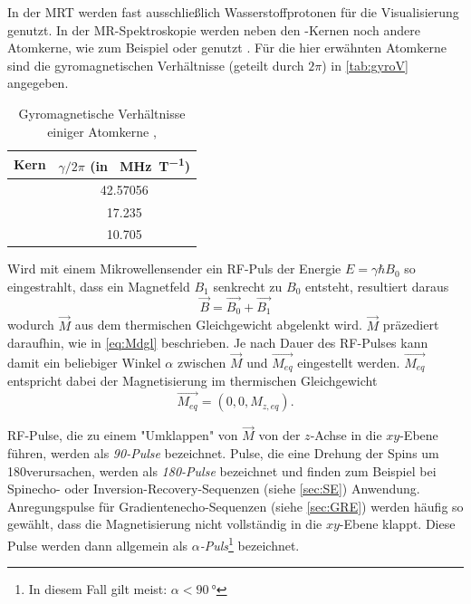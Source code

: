 In der MRT werden fast ausschließlich Wasserstoffprotonen für die Visualisierung genutzt. In der MR-Spektroskopie werden neben den -Kernen noch andere Atomkerne, wie zum Beispiel  oder  genutzt \cite{Andrade2014}. Für die hier erwähnten Atomkerne sind die gyromagnetischen Verhältnisse (geteilt durch $2\pi$) in \autoref{tab:gyroV} angegeben.

\begin{table}[H]
	\centering
	\caption[Auswahl gyromagnetischer Verhältnisse]{Gyromagnetische Verhältnisse einiger Atomkerne \cite{Seidel2015},\cite{Weast1984}}
	\label{tab:gyroV}
	\begin{tabular}{lS}
		\toprule
		\textbf{Kern} & \textbf{$\gamma/2\pi$ (in \SI{}{\mega\hertz\per\tesla})} \\
		\midrule
		 & 42.57056 \\
		 & 17.235 \\
		 & 10.705 \\
		\bottomrule
	\end{tabular}
\end{table}

Wird mit einem Mikrowellensender ein RF-Puls der Energie $E=\gamma \hbar B_0$ so eingestrahlt, dass ein Magnetfeld $B_1$ senkrecht zu $B_0$ entsteht, resultiert daraus
\begin{equation}
	\vec{B}=\vec{B_0}+\vec{B_1}
\end{equation}
wodurch $\vec{M}$ aus dem thermischen Gleichgewicht abgelenkt wird. $\vec{M}$ präzediert daraufhin, wie in \autoref{eq:Mdgl} beschrieben. Je nach Dauer des RF-Pulses kann damit ein beliebiger Winkel $\alpha$ zwischen $\vec{M}$ und $\vec{M_{eq}}$ eingestellt werden. $\vec{M_{eq}}$ entspricht dabei der Magnetisierung im thermischen Gleichgewicht
\begin{equation}
	\vec{M_{eq}} = (0,0,M_{z,eq}).
\end{equation}
 
RF-Pulse, die zu einem "Umklappen" von $\vec{M}$ von der $z$-Achse in die $xy$-Ebene führen, werden als \textit{90\degree-Pulse} bezeichnet. Pulse, die eine Drehung der Spins um 180\degree verursachen, werden als \textit{180\degree-Pulse} bezeichnet und finden zum Beispiel bei Spinecho- oder Inversion-Recovery-Sequenzen (siehe \autoref{sec:SE}) Anwendung. Anregungspulse für Gradienten\-echo-Sequenzen (siehe \autoref{sec:GRE}) werden häufig so gewählt, dass die Magnetisierung nicht vollständig in die $xy$-Ebene klappt. Diese Pulse werden dann allgemein als \textit{$\alpha$-Puls}\footnote{In diesem Fall gilt meist: $\alpha<\SI{90}{\degree}$} bezeichnet.

